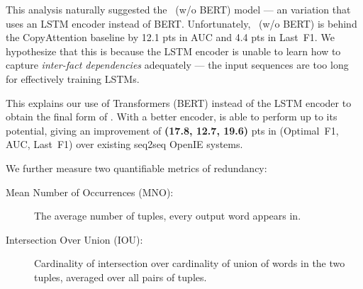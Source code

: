         \begin{table}
        \caption{Evaluating models trained with different bootstrapping systems.}
        \label{tab:bootstrapping-datasets}
        \end{table}

        This analysis naturally suggested the \shortname~(w/o BERT) model --- an \shortname{} variation that uses an LSTM encoder instead of BERT. Unfortunately, \shortname~(w/o BERT) is behind the CopyAttention baseline by 12.1 pts in AUC and 4.4 pts in Last~F1. We hypothesize that this is because the LSTM encoder is unable to learn how to capture \textit{inter-fact dependencies} adequately --- the input sequences are too long for effectively training LSTMs.

        This explains our use of Transformers (BERT) instead of the LSTM encoder to obtain the final form of \shortname.  With a better encoder, \shortname{} is able to perform up to its potential, giving an improvement of \textbf{(17.8, 12.7, 19.6)} pts in (Optimal~F1, AUC, Last~F1) over existing seq2seq OpenIE systems.

        We further measure two quantifiable metrics of redundancy:
        \begin{description}
        \item[Mean Number of Occurrences (MNO):] The average number of tuples, every output word appears in.
        \item[Intersection Over Union (IOU):] Cardinality of intersection over cardinality of union of words in the two tuples, averaged over all pairs of tuples.
        \end{description}

